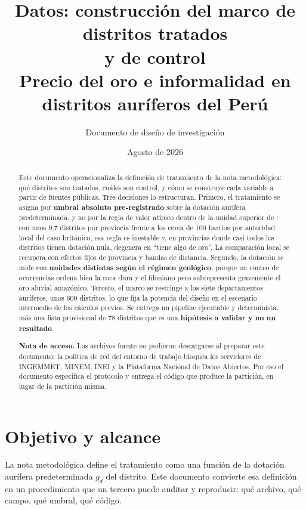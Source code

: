 \documentclass[11pt,a4paper]{article}
\title{\textbf{Datos: construcción del marco de distritos tratados\\ y de control}\\[0.6em]
\large Precio del oro e informalidad en distritos auríferos del Perú}
\author{Documento de diseño de investigación}
\date{Agosto de 2026}
\begin{document}
\maketitle

\begin{abstract}
\noindent Este documento operacionaliza la definición de tratamiento de la nota metodológica: qué distritos son tratados, cuáles son control, y cómo se construye cada variable a partir de fuentes públicas. Tres decisiones lo estructuran. Primero, el tratamiento se asigna por \textbf{umbral absoluto pre-registrado} sobre la dotación aurífera predeterminada, y no por la regla de valor atípico dentro de la unidad superior de \citet{braakmann2024}: con unos 9{,}7 distritos por provincia frente a los cerca de 100 barrios por autoridad local del caso británico, esa regla es inestable y, en provincias donde casi todos los distritos tienen dotación nula, degenera en ``tiene algo de oro''. La comparación local se recupera con efectos fijos de provincia y bandas de distancia. Segundo, la dotación se mide con \textbf{unidades distintas según el régimen geológico}, porque un conteo de ocurrencias ordena bien la roca dura y el filoniano pero subrepresenta gravemente el oro aluvial amazónico. Tercero, el marco se restringe a los siete departamentos auríferos, unos 600 distritos, lo que fija la potencia del diseño en el escenario intermedio de los cálculos previos. Se entrega un pipeline ejecutable y determinista, más una lista provisional de 78 distritos que es una \textbf{hipótesis a validar y no un resultado}.

\medskip
\noindent\textbf{Nota de acceso.} Los archivos fuente no pudieron descargarse al preparar este documento: la política de red del entorno de trabajo bloquea los servidores de INGEMMET, MINEM, INEI y la Plataforma Nacional de Datos Abiertos. Por eso el documento especifica el protocolo y entrega el código que produce la partición, en lugar de la partición misma.
\end{abstract}

\newpage
\onehalfspacing

\section{Objetivo y alcance}

La nota metodológica define el tratamiento como una función de la dotación aurífera predeterminada $g_d$ del distrito. Este documento convierte esa definición en un procedimiento que un tercero puede auditar y reproducir: qué archivo, qué campo, qué umbral, qué código.
\end{document}
